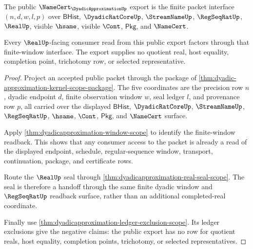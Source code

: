 \begin{theorem}\label{thm:dyadicapproximation-public-finite-window-export}
The public $\NameCert_{\DyadicApproximationUp}$ export is the finite packet interface $(n,d,w,l,p)$ over $\mathsf{BHist}$, $\DyadicRatCoreUp$, $\StreamNameUp$, $\RegSeqRatUp$, $\RealUp$, visible $\hsame$, visible $\Cont$, $\mathsf{Pkg}$, and $\NameCert$.

Every $\RealUp$-facing consumer read from this public export factors through that finite-window interface. The export supplies no quotient real, host equality, completion point, trichotomy row, or selected representative.
\end{theorem}
\begin{proof}
Project an accepted public packet through the package of \autoref{thm:dyadic-approximation-kernel-scope-package}. The five coordinates are the precision row $n$, dyadic endpoint $d$, finite observation window $w$, seal ledger $l$, and provenance row $p$, all carried over the displayed $\mathsf{BHist}$, $\DyadicRatCoreUp$, $\StreamNameUp$, $\RegSeqRatUp$, $\hsame$, $\Cont$, $\mathsf{Pkg}$, and $\NameCert$ surface.

Apply \autoref{thm:dyadicapproximation-window-scope} to identify the finite-window readback. This shows that any consumer access to the packet is already a read of the displayed endpoint, schedule, regular-sequence window, transport, continuation, package, and certificate rows.

Route the $\RealUp$ seal through \autoref{thm:dyadicapproximation-real-seal-scope}. The seal is therefore a handoff through the same finite dyadic window and $\RegSeqRatUp$ readback surface, rather than an additional completed-real coordinate.

Finally use \autoref{thm:dyadicapproximation-ledger-exclusion-scope}. Its ledger exclusions give the negative claims: the public export has no row for quotient reals, host equality, completion points, trichotomy, or selected representatives.
\end{proof}
